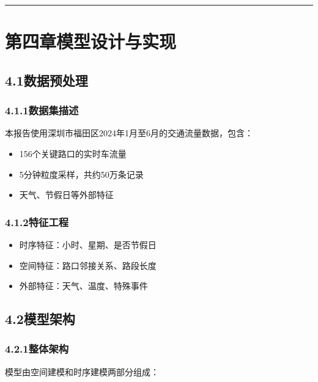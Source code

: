 \documentclass{harryopo-report}
\begin{document}
\medskip\hrule\medskip

\chapter*{第四章模型设计与实现}

\section*{4.1数据预处理}

\subsection*{4.1.1数据集描述}

本报告使用深圳市福田区2024年1月至6月的交通流量数据，包含：

\begin{itemize}
  \item 156个关键路口的实时车流量
  \item 5分钟粒度采样，共约50万条记录
  \item 天气、节假日等外部特征
\end{itemize}

\subsection*{4.1.2特征工程}

\begin{itemize}
  \item 时序特征：小时、星期、是否节假日
  \item 空间特征：路口邻接关系、路段长度
  \item 外部特征：天气、温度、特殊事件
\end{itemize}

\section*{4.2模型架构}

\subsection*{4.2.1整体架构}

模型由{\fzht 空间建模}和{\fzht 时序建模}两部分组成：
\end{document}
